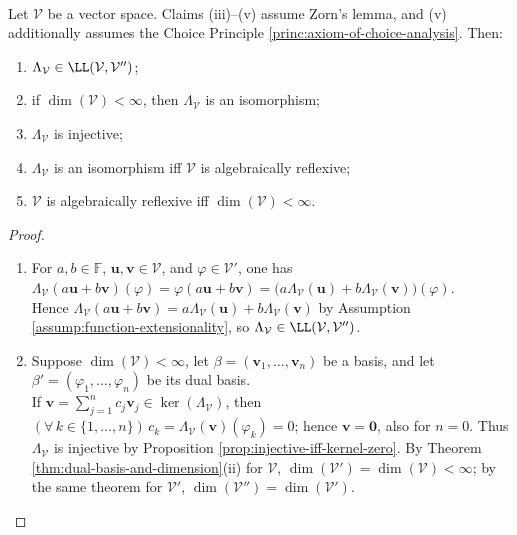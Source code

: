 \begin{theorem} \label{thm:algebraic-reflexivity-natural-map} \\
Let $\mathcal{V}$ be a vector space. Claims (iii)--(v) assume Zorn's lemma, and (v) additionally assumes the Choice Principle \ref{princ:axiom-of-choice-analysis}. Then:
\begin{enumerate}[label=(\roman*)]
\setlength{\itemsep}{0pt}
\item $\Lambda_{\mathcal{V}}\in\LL(\mathcal{V},\mathcal{V}'')$;
\item if $\dim(\mathcal{V})<\infty$, then $\Lambda_{\mathcal{V}}$ is an isomorphism;
\item $\Lambda_{\mathcal{V}}$ is injective;
\item $\Lambda_{\mathcal{V}}$ is an isomorphism iff $\mathcal{V}$ is algebraically reflexive;
\item $\mathcal{V}$ is algebraically reflexive iff $\dim(\mathcal{V})<\infty$.
\end{enumerate}
\begin{proof}
\begin{enumerate}[label=(\roman*)]
\setlength{\itemsep}{0pt}
\item[$(i)$] For $a,b\in\mathbb{F}$, $\mathbf{u},\mathbf{v}\in\mathcal{V}$, and $\varphi\in\mathcal{V}'$, one has $\Lambda_{\mathcal{V}}(a\mathbf{u}+b\mathbf{v})(\varphi)=\varphi(a\mathbf{u}+b\mathbf{v})=\bigl(a\Lambda_{\mathcal{V}}(\mathbf{u})+b\Lambda_{\mathcal{V}}(\mathbf{v})\bigr)(\varphi)$.\\
Hence $\Lambda_{\mathcal{V}}(a\mathbf{u}+b\mathbf{v})=a\Lambda_{\mathcal{V}}(\mathbf{u})+b\Lambda_{\mathcal{V}}(\mathbf{v})$ by Assumption \ref{assump:function-extensionality}, so $\Lambda_{\mathcal{V}}\in\LL(\mathcal{V},\mathcal{V}'')$.
\item[$(ii)$] Suppose $\dim(\mathcal{V})<\infty$, let $\beta=(\mathbf{v}_1,\ldots,\mathbf{v}_n)$ be a basis, and let $\beta'=(\varphi_1,\ldots,\varphi_n)$ be its dual basis.\\
If $\mathbf{v}=\sum\limits_{j=1}^{n}c_j\mathbf{v}_j\in\ker(\Lambda_{\mathcal{V}})$, then $(\forall\,k\in\{1,\ldots,n\})\,c_k=\Lambda_{\mathcal{V}}(\mathbf{v})(\varphi_k)=0$; hence $\mathbf{v}=\mathbf{0}$, also for $n=0$. Thus $\Lambda_{\mathcal{V}}$ is injective by Proposition \ref{prop:injective-iff-kernel-zero}. By Theorem \ref{thm:dual-basis-and-dimension}(ii) for $\mathcal{V}$, $\dim(\mathcal{V}')=\dim(\mathcal{V})<\infty$; by the same theorem for $\mathcal{V}'$, $\dim(\mathcal{V}'')=\dim(\mathcal{V}')$.\\

\end{enumerate}
\end{proof}
\end{theorem}
